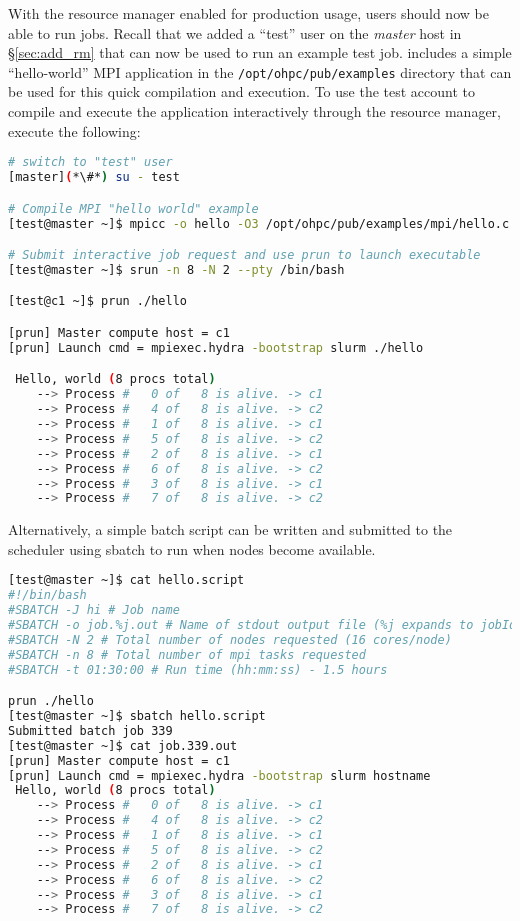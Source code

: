 With the resource manager enabled for production usage, users should now be
able to run jobs.  Recall that we added a ``test'' user on the {\em master}
host in \S\ref{sec:add_rm} that can now be used to run an example test job.
\OHPC{} includes a simple ``hello-world'' MPI application in the
\texttt{/opt/ohpc/pub/examples} directory that can be used for this quick
compilation and execution.  To use the test account to compile and execute the
application interactively through the resource manager, execute the following:

\begin{lstlisting}[language=bash,keywords={}]
# switch to "test" user
[master](*\#*) su - test

# Compile MPI "hello world" example
[test@master ~]$ mpicc -o hello -O3 /opt/ohpc/pub/examples/mpi/hello.c

# Submit interactive job request and use prun to launch executable
[test@master ~]$ srun -n 8 -N 2 --pty /bin/bash

[test@c1 ~]$ prun ./hello

[prun] Master compute host = c1
[prun] Launch cmd = mpiexec.hydra -bootstrap slurm ./hello

 Hello, world (8 procs total)
    --> Process #   0 of   8 is alive. -> c1
    --> Process #   4 of   8 is alive. -> c2
    --> Process #   1 of   8 is alive. -> c1
    --> Process #   5 of   8 is alive. -> c2
    --> Process #   2 of   8 is alive. -> c1
    --> Process #   6 of   8 is alive. -> c2
    --> Process #   3 of   8 is alive. -> c1
    --> Process #   7 of   8 is alive. -> c2
\end{lstlisting}

Alternatively, a simple batch script can be written and submitted to the
scheduler using sbatch to run when nodes become available. 

\begin{lstlisting}[language=bash,keywords={}]
[test@master ~]$ cat hello.script
#!/bin/bash
#SBATCH -J hi # Job name
#SBATCH -o job.%j.out # Name of stdout output file (%j expands to jobId)
#SBATCH -N 2 # Total number of nodes requested (16 cores/node)
#SBATCH -n 8 # Total number of mpi tasks requested
#SBATCH -t 01:30:00 # Run time (hh:mm:ss) - 1.5 hours

prun ./hello
[test@master ~]$ sbatch hello.script
Submitted batch job 339
[test@master ~]$ cat job.339.out
[prun] Master compute host = c1
[prun] Launch cmd = mpiexec.hydra -bootstrap slurm hostname
 Hello, world (8 procs total)
    --> Process #   0 of   8 is alive. -> c1
    --> Process #   4 of   8 is alive. -> c2
    --> Process #   1 of   8 is alive. -> c1
    --> Process #   5 of   8 is alive. -> c2
    --> Process #   2 of   8 is alive. -> c1
    --> Process #   6 of   8 is alive. -> c2
    --> Process #   3 of   8 is alive. -> c1
    --> Process #   7 of   8 is alive. -> c2
\end{lstlisting}

